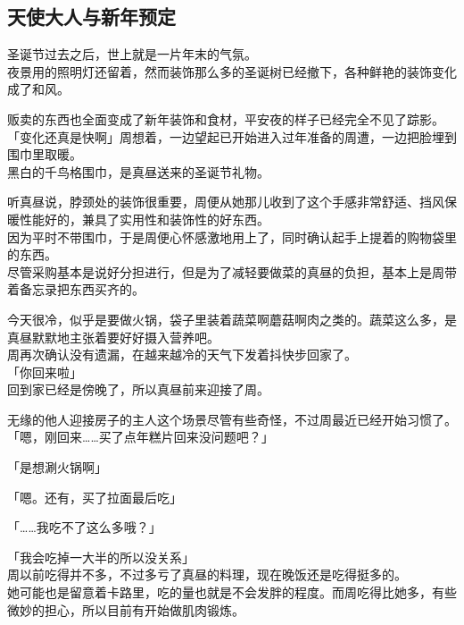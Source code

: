 \subsection{天使大人与新年预定}

圣诞节过去之后，世上就是一片年末的气氛。\\

夜景用的照明灯还留着，然而装饰那么多的圣诞树已经撤下，各种鲜艳的装饰变化成了和风。

贩卖的东西也全面变成了新年装饰和食材，平安夜的样子已经完全不见了踪影。\\

「变化还真是快啊」周想着，一边望起已开始进入过年准备的周遭，一边把脸埋到围巾里取暖。\\

黑白的千鸟格围巾，是真昼送来的圣诞节礼物。

听真昼说，脖颈处的装饰很重要，周便从她那儿收到了这个手感非常舒适、挡风保暖性能好的，兼具了实用性和装饰性的好东西。\\

因为平时不带围巾，于是周便心怀感激地用上了，同时确认起手上提着的购物袋里的东西。\\

尽管采购基本是说好分担进行，但是为了减轻要做菜的真昼的负担，基本上是周带着备忘录把东西买齐的。

今天很冷，似乎是要做火锅，袋子里装着蔬菜啊蘑菇啊肉之类的。蔬菜这么多，是真昼默默地主张着要好好摄入营养吧。\\

周再次确认没有遗漏，在越来越冷的天气下发着抖快步回家了。\\

「你回来啦」\\

回到家已经是傍晚了，所以真昼前来迎接了周。

无缘的他人迎接房子的主人这个场景尽管有些奇怪，不过周最近已经开始习惯了。\\

「嗯，刚回来……买了点年糕片回来没问题吧？」

「是想涮火锅啊」

「嗯。还有，买了拉面最后吃」

「……我吃不了这么多哦？」

「我会吃掉一大半的所以没关系」\\

周以前吃得并不多，不过多亏了真昼的料理，现在晚饭还是吃得挺多的。\\

她可能也是留意着卡路里，吃的量也就是不会发胖的程度。而周吃得比她多，有些微妙的担心，所以目前有开始做肌肉锻炼。\\

